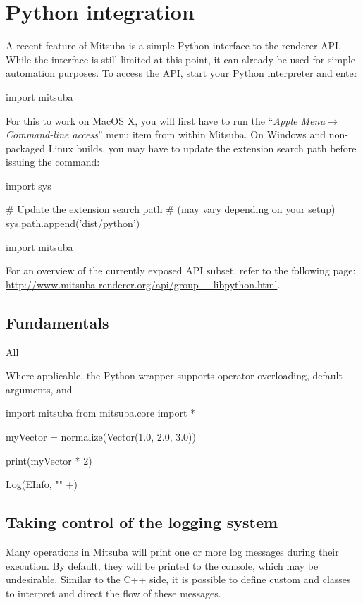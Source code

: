 \section{Python integration}
\label{sec:python}
A recent feature of Mitsuba is a simple Python interface to the renderer API. 
While the interface is still limited at this point, it can already be
used for simple automation purposes. To access the API, start your Python 
interpreter and enter
\begin{python}
import mitsuba
\end{python}
For this to work on MacOS X, you will first have to run the ``\emph{Apple
Menu}$\to$\emph{Command-line access}'' menu item from within Mitsuba.
On Windows and non-packaged Linux builds, you may have to update the extension
search path before issuing the  command:
\begin{python}
import sys

# Update the extension search path
# (may vary depending on your setup)
sys.path.append('dist/python')

import mitsuba
\end{python}
For an overview of the currently exposed API subset, refer
to the following page: \url{http://www.mitsuba-renderer.org/api/group__libpython.html}.

\subsection{Fundamentals}
All 

Where applicable, the Python wrapper supports operator overloading,
default arguments, and 
\begin{python}
import mitsuba
from mitsuba.core import *

myVector = normalize(Vector(1.0, 2.0, 3.0))

print(myVector * 2)

Log(EInfo, "" +)
\end{python}

\subsection{Taking control of the logging system}
Many operations in Mitsuba will print one or more log messages
during their execution. By default, they will be printed to the console,
which may be undesirable. Similar to the C++ side, it is possible to define
custom  and  classes to interpret and direct
the flow of these messages. 

